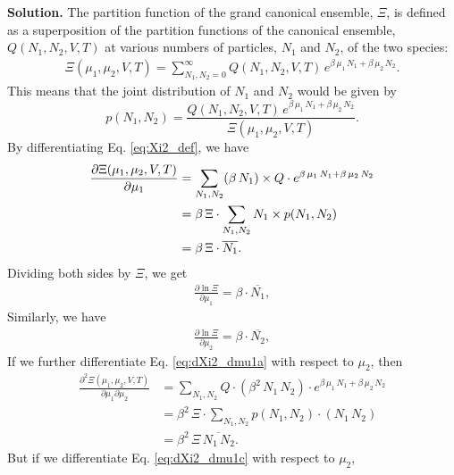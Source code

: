 \documentclass[twocolumn, 10pt]{article}
\numberwithin{equation}{section}
\newenvironment{solution}
{\par\medskip
  \textbf{Solution. }\ignorespaces}
{\medskip}
\begin{document}
\begin{solution}
The partition function of the grand canonical ensemble, $\Xi$,
is defined as a superposition of
the partition functions of the canonical ensemble, $Q(N_1, N_2, V, T)$
at various numbers of particles, $N_1$ and $N_2$,
of the two species:
\begin{align}
\Xi(\mu_1, \mu_2, V, T)
=
\sum_{N_1, N_2=0}^\infty
  Q(N_1, N_2, V, T) \,
  e^{\beta \, \mu_1 \, N_1 + \beta \, \mu_2 \, N_2}.
\label{eq:Xi2_def}
\end{align}
%
This means that the joint distribution of $N_1$ and $N_2$
would be given by
$$
p(N_1, N_2) = \frac{ Q(N_1, N_2, V, T) \, e^{\beta \, \mu_1 \, N_1 + \beta \, \mu_2 \, N_2} }
                   { \Xi(\mu_1, \mu_2, V, T) }.
$$
By differentiating Eq. \eqref{eq:Xi2_def},
we have
\begin{align}
  \frac{ \partial \Xi(\mu_1, \mu_2, V, T) }
       { \partial \mu_1 }
  &=
  \sum_{N_1, N_2}
    (\beta \, N_1) \times Q \cdot
    e^{\beta \, \mu_1 \, N_1 + \beta \, \mu_2 \, N_2}
  \label{eq:dXi2_dmu1a}
  \\
  &=
    \beta \, \Xi \cdot
    \sum_{N_1, N_2}
    N_1 \times p(N_1, N_2)
  \notag
  \\
  &=
    \beta \, \Xi \cdot
    \overline{ N_1 }
  .
  \label{eq:dXi2_dmu1c}
\end{align}
%
Dividing both sides by $\Xi$, we get
%
\begin{align*}
  \frac{ \partial \ln \Xi } { \partial \mu_1 }
  = \beta \cdot \overline{ N_1 },
\end{align*}
%
Similarly, we have
\begin{align}
  \frac{ \partial \ln \Xi } { \partial \mu_2 }
  = \beta \cdot \overline{ N_2 },
  \label{eq:dlnXi2_dmu2}
\end{align}
%
If we further differentiate Eq. \eqref{eq:dXi2_dmu1a}
with respect to $\mu_2$, then
\begin{align*}
  \frac{ \partial^2 \Xi(\mu_1, \mu_2, V, T) }
       { \partial \mu_1 \partial \mu_2 }
  &=
  \sum_{N_1, N_2}
    Q \cdot (\beta^2 \, N_1 \, N_2) \cdot
    e^{\beta \, \mu_1 \, N_1 + \beta \, \mu_2 \, N_2}
  \\
  &=
    \beta^2 \, \Xi \cdot
    \sum_{N_1, N_2}
    p(N_1, N_2) \cdot (N_1 \, N_2)
  \\
  &=
  \beta^2 \, \Xi \, \overline{ N_1 \, N_2 }
  .
\end{align*}
%
But if we differentiate Eq. \eqref{eq:dXi2_dmu1c}
with respect to $\mu_2$,
\begin{align*}

\end{align*}
\end{solution}
\end{document}
